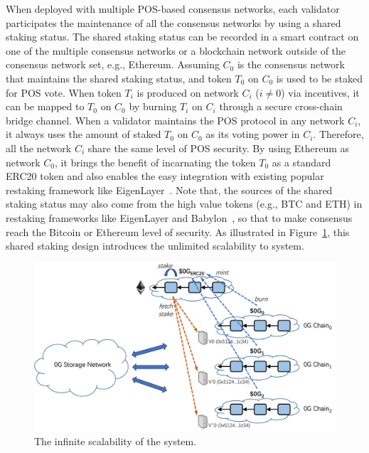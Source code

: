 When deployed with multiple POS-based consensus networks, each validator participates the maintenance of all the consensus networks by using a shared staking status.
The shared staking status can be recorded in a smart contract on one of the multiple consensus networks or a blockchain network outside of the \projabbrev consensus network set, e.g., Ethereum. 
Assuming $C_0$ is the consensus network that maintains the shared staking status, and token $T_0$ on $C_0$ is used to be staked for POS vote.  
When token $T_i$ is produced on network $C_i$ ($i \neq 0$) via incentives, it can be mapped to $T_0$ on $C_0$ by burning $T_i$ on $C_i$ through a secure cross-chain bridge channel.
When a validator maintains the POS protocol in any network $C_i$, it always uses the amount of staked $T_0$ on $C_0$ as its voting power in $C_i$. 
Therefore, all the network $C_i$ share the same level of POS security. 
By using Ethereum as network $C_0$, it brings the benefit of incarnating the token $T_0$ as a standard ERC20 token and also enables the easy integration with existing popular restaking framework like EigenLayer~\cite{eigenlayer}.
Note that, the sources of the shared staking status may also come from the high value tokens (e.g., BTC and ETH) in restaking frameworks like EigenLayer and Babylon~\cite{babylon}, so that to make \projabbrev consensus reach the Bitcoin or Ethereum level of security.  
As illustrated in Figure~\ref{fig:scale}, this shared staking design introduces the unlimited scalability to \projabbrev system.

\begin{figure}[H]	
	\includegraphics[width=\textwidth]{figure/scale.pdf}
	\caption{The infinite scalability of the \projabbrev system.}
	\label{fig:scale}
\end{figure}

